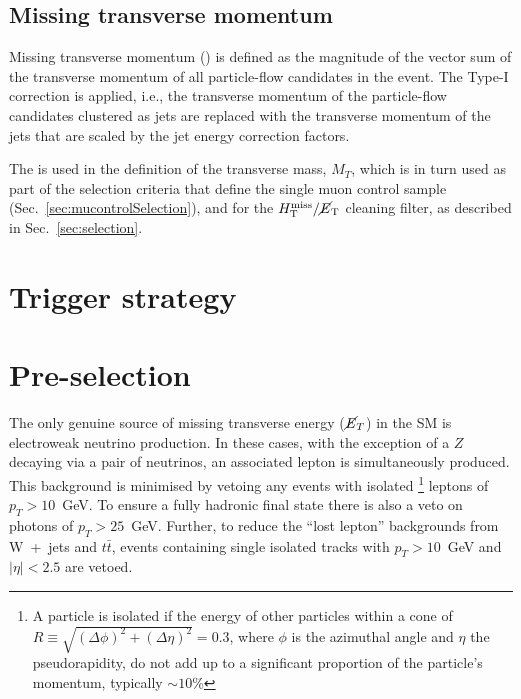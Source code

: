 \subsection{Missing transverse momentum}
Missing transverse momentum (\met) is defined as the magnitude of the vector sum
of the transverse momentum of all particle-flow candidates in the event.
The Type-I \met correction \cite{Khachatryan:2014gga} is applied, i.e., the transverse momentum of
the particle-flow candidates clustered as jets are replaced with the
transverse momentum of the jets that are scaled by the jet energy
correction factors.

The \met is used in the definition of 
the transverse mass, $M_{T}$, which is in turn used as part of
the selection criteria that define the single muon control sample 
(Sec.~\ref{sec:mucontrolSelection}), and for the $\mbox{$\mbox{$H_{\rm T}^{\rm miss}$} / \mbox{$\cancel{E}_\text{T}$}$}$ cleaning filter, 
as described in Sec.~\ref{sec:selection}.


\section{Trigger strategy}





\section{Pre-selection}%
\label{sec:preselection}

The only genuine source of missing transverse energy ($\cancel{E}_T$)
in the SM is electroweak neutrino production. In these cases, with the
exception of a $Z$ decaying via a pair of neutrinos, an associated
lepton is simultaneously produced. This background is minimised by
vetoing any events with isolated \footnote{A particle is isolated if
the energy of other particles within a cone of
$R\equiv\sqrt{(\Delta\phi)^2+(\Delta\eta)^2}=0.3$, where $\phi$ is the
azimuthal angle and $\eta$ the pseudorapidity, do not add up to a
significant proportion of the particle's momentum, typically
$\sim10$\%} leptons of $p_T>10$~GeV. To ensure a fully hadronic final
state there is also a veto on photons of $p_T>25$~GeV. Further, to
reduce the ``lost lepton'' backgrounds from W~+~jets and $t\bar{t}$,
events containing single isolated tracks with $p_T >10$~GeV and
$|\eta| < 2.5$ are vetoed.

